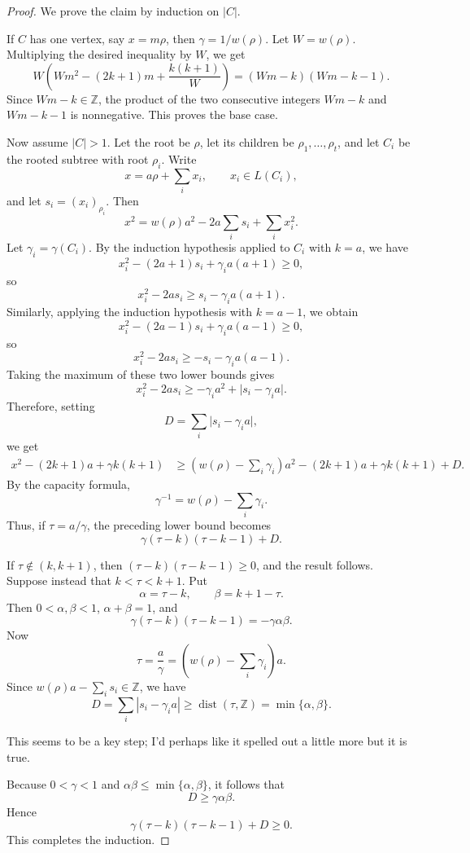 \documentclass[12pt]{article}
\newcommand{\review}[1]{\begin{reviewbox}#1\end{reviewbox}}
\begin{document}
\begin{proof}
We prove the claim by induction on \(|C|\).

If \(C\) has one vertex, say \(x=m\rho\), then \(\gamma=1/w(\rho)\). Let \(W=w(\rho)\). Multiplying the desired inequality by \(W\), we get
\[
W\left(Wm^2-(2k+1)m+\frac{k(k+1)}{W}\right)
=
(Wm-k)(Wm-k-1).
\]
Since \(Wm-k\in\mathbb Z\), the product of the two consecutive integers \(Wm-k\) and \(Wm-k-1\) is nonnegative. This proves the base case.

Now assume \(|C|>1\). Let the root be \(\rho\), let its children be \(\rho_1,\dots,\rho_t\), and let \(C_i\) be the rooted subtree with root \(\rho_i\). Write
\[
x=a\rho+\sum_i x_i,
\qquad x_i\in L(C_i),
\]
and let \(s_i=(x_i)_{\rho_i}\). Then
\[
x^2=w(\rho)a^2-2a\sum_i s_i+\sum_i x_i^2.
\]
Let \(\gamma_i=\gamma(C_i)\). By the induction hypothesis applied to \(C_i\) with \(k=a\), we have
\[
x_i^2-(2a+1)s_i+\gamma_i a(a+1)\ge 0,
\]
so
\[
x_i^2-2as_i\ge s_i-\gamma_i a(a+1).
\]
Similarly, applying the induction hypothesis with \(k=a-1\), we obtain
\[
x_i^2-(2a-1)s_i+\gamma_i a(a-1)\ge 0,
\]
so
\[
x_i^2-2as_i\ge -s_i-\gamma_i a(a-1).
\]
Taking the maximum of these two lower bounds gives
\[
x_i^2-2as_i
\ge
-\gamma_i a^2+\bigl|s_i-\gamma_i a\bigr|.
\]
Therefore, setting
\[
D=\sum_i \bigl|s_i-\gamma_i a\bigr|,
\]
we get
\begin{align*}
x^2-(2k+1)a+\gamma k(k+1)
&\ge
\left(w(\rho)-\sum_i\gamma_i\right)a^2-(2k+1)a+\gamma k(k+1)+D.
\end{align*}
By the capacity formula,
\[
\gamma^{-1}=w(\rho)-\sum_i\gamma_i.
\]
Thus, if \(\tau=a/\gamma\), the preceding lower bound becomes
\[
\gamma(\tau-k)(\tau-k-1)+D.
\]

If \(\tau\notin(k,k+1)\), then \((\tau-k)(\tau-k-1)\ge 0\), and the result follows. Suppose instead that \(k<\tau<k+1\). Put
\[
\alpha=\tau-k,
\qquad
\beta=k+1-\tau.
\]
Then \(0<\alpha,\beta<1\), \(\alpha+\beta=1\), and
\[
\gamma(\tau-k)(\tau-k-1)=-\gamma\alpha\beta.
\]
Now
\[
\tau
=
\frac{a}{\gamma}
=
\left(w(\rho)-\sum_i\gamma_i\right)a.
\]
Since \(w(\rho)a-\sum_i s_i\in\mathbb Z\), we have
\[
D
=
\sum_i |s_i-\gamma_i a|
\ge
\operatorname{dist}(\tau,\mathbb Z)
=
\min\{\alpha,\beta\}.
\]
\review{This seems to be a key step; I'd perhaps like it spelled out a little more but it is true.}
Because \(0<\gamma<1\) and \(\alpha\beta\le \min\{\alpha,\beta\}\), it follows that
\[
D\ge \gamma\alpha\beta.
\]
Hence
\[
\gamma(\tau-k)(\tau-k-1)+D\ge 0.
\]
This completes the induction.
\end{proof}
\end{document}
